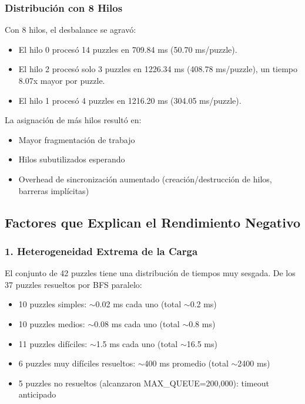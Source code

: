 \documentclass[12pt,a4paper]{article}
\begin{document}
\subsubsection{Distribución con 8 Hilos}

Con 8 hilos, el desbalance se agravó:

\begin{itemize}
    \item El hilo 0 procesó 14 puzzles en 709.84 ms (50.70 ms/puzzle).
    \item El hilo 2 procesó solo 3 puzzles en 1226.34 ms (408.78 ms/puzzle), un tiempo 8.07x mayor por puzzle.
    \item El hilo 1 procesó 4 puzzles en 1216.20 ms (304.05 ms/puzzle).
\end{itemize}

La asignación de más hilos resultó en:
\begin{itemize}
    \item Mayor fragmentación de trabajo
    \item Hilos subutilizados esperando
    \item Overhead de sincronización aumentado (creación/destrucción de hilos, barreras implícitas)
\end{itemize}

\subsection{Factores que Explican el Rendimiento Negativo}

\subsubsection{1. Heterogeneidad Extrema de la Carga}

El conjunto de 42 puzzles tiene una distribución de tiempos muy sesgada. De los 37 puzzles resueltos por BFS paralelo:

\begin{itemize}
    \item 10 puzzles simples: $\sim$0.02 ms cada uno (total $\sim$0.2 ms)
    \item 10 puzzles medios: $\sim$0.08 ms cada uno (total $\sim$0.8 ms)
    \item 11 puzzles difíciles: $\sim$1.5 ms cada uno (total $\sim$16.5 ms)
    \item 6 puzzles muy difíciles resueltos: $\sim$400 ms promedio (total $\sim$2400 ms)
    \item 5 puzzles no resueltos (alcanzaron MAX\_QUEUE=200,000): timeout anticipado
\end{itemize}
\end{document}
